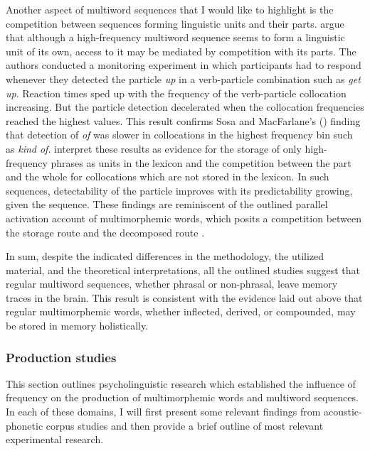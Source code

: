 Another aspect of multiword sequences that I would like to highlight is the competition between sequences forming linguistic units and their parts. \citet{kapatsinski-radicke} argue that although a high-frequency multiword sequence seems to form a linguistic unit of its own, access to it may be mediated by competition with its parts. The authors conducted a monitoring experiment in which participants had to respond whenever they detected the particle \textit{up} in a verb-particle combination such as \textit{get up}. Reaction times sped up with the frequency of the verb-particle collocation increasing. But the particle detection decelerated when the collocation frequencies reached the highest values. This result confirms Sosa and MacFarlane's (\citeyear{sosa-macfarlane}) finding that detection of \textit{of} was slower in collocations in the highest frequency bin such as \textit{kind of}. \citeauthor{kapatsinski-radicke} interpret these results as evidence for the storage of only high-frequency phrases as units in the lexicon and the competition between the part and the whole for collocations which are not stored in the lexicon. In such sequences, detectability of the particle improves with its predictability growing, given the sequence. These findings are reminiscent of the outlined parallel activation account of multimorphemic words, which posits a competition between the storage route and the decomposed route \citep{baayen-dijkstra-schreuder,hay-2001}.

In sum, despite the indicated differences in the methodology, the utilized material, and the theoretical interpretations, all the outlined studies suggest that regular multiword sequences, whether phrasal or non-phrasal, leave memory traces in the brain. This result is consistent with the evidence laid out above that regular multimorphemic words, whether inflected, derived, or compounded, may be stored in memory holistically.

\subsubsection{Production studies}

This section outlines psycholinguistic research which established the influence of frequency on the production of multimorphemic words and multiword sequences. In each of these domains, I will first present some relevant findings from acoustic-phonetic corpus studies and then provide a brief outline of most relevant experimental research. 

